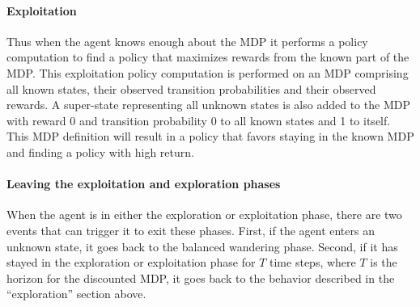 \paragraph{Exploitation}

Thus when the agent knows enough about the MDP it performs a policy computation
to find a policy that maximizes rewards from the known part of the MDP. This
exploitation policy computation is performed on an MDP comprising all known
states, their observed transition probabilities and their observed rewards. A
super-state representing all unknown states is also added to the MDP with
reward 0 and transition probability 0 to all known states and 1 to itself.
This MDP definition will result in a policy that favors staying in the known
MDP and finding a policy with high return.


\paragraph{Leaving the exploitation and exploration phases}

When the agent is in either the exploration or exploitation phase, there are
two events that can trigger it to exit these phases. First, if the agent enters
an unknown state, it goes back to the balanced wandering phase. Second, if it
has stayed in the exploration or exploitation phase for $T$ time steps, where
$T$ is the horizon for the discounted MDP, it goes back to the behavior
described in the ``exploration'' section above.

